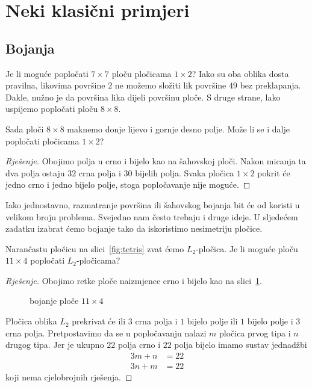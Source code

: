 \documentclass[11pt]{scrartcl}
\begin{document}
\section{Neki klasični primjeri} \label{odj:bojanja}
\subsection{Bojanja}
Je li moguće popločati $7 \times 7$ ploču pločicama $1 \times 2$? Iako su oba oblika dosta pravilna, likovima površine $2$ ne možemo složiti lik površine $49$ bez preklapanja. Dakle, nužno je da površina lika dijeli površinu ploče. S druge strane, lako uspijemo popločati ploču $8 \times 8$.

\begin{zadatak} \label{sahovnicabezdva}
Sada ploči $8 \times 8$ maknemo donje lijevo i gornje desno polje. Može li se i dalje popločati pločicama $1 \times 2$?
\end{zadatak}

\begin{proof}[Rješenje]
Obojimo polja u crno i bijelo kao na šahovskoj ploči. Nakon micanja ta dva polja ostaju $32$ crna polja i $30$ bijelih polja. Svaka pločica $1 \times 2$ pokrit će jedno crno i jedno bijelo polje, stoga popločavanje nije moguće.
\end{proof}

Iako jednostavno, razmatranje površina ili šahovskog bojanja bit će od koristi u velikom broju problema. Svejedno nam često trebaju i druge ideje. U sljedećem zadatku izabrat ćemo bojanje tako da iskoristimo nesimetriju pločice.

\begin{zadatak}
Narančastu pločicu na slici~\ref{fig:tetris} zvat ćemo $L_2$-pločica. Je li moguće ploču $11 \times 4$ popločati $L_2$-pločicama?
\end{zadatak}

\begin{proof}[Rješenje]
Obojimo retke ploče naizmjence crno i bijelo kao na slici~\ref{fig:4times11}.
\begin{figure}[h!]
\centering
{}
\caption{bojanje ploče $11 \times 4$}
\label{fig:4times11}
\end{figure}
Pločica oblika $L_2$ prekrivat će ili $3$ crna polja i $1$ bijelo polje ili $1$ bijelo polje i $3$ crna polja. Pretpostavimo da se u popločavanju nalazi $m$ pločica prvog tipa i $n$ drugog tipa. Jer je ukupno $22$ polja crno i $22$ polja bijelo imamo sustav jednadžbi 
\begin{align*}
3m + n&=22\\
3n + m&=22
\end{align*}
koji nema cjelobrojnih rješenja.
\end{proof}
\end{document}
